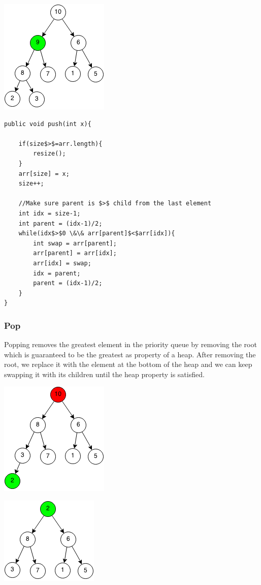 \documentclass[11pt,oneside]{book}
\makeatletter
\def\maxwidth#1{\ifdim\Gin@nat@width>#1 #1\else\Gin@nat@width\fi}
\makeatother
\begin{document}
\includegraphics[width=\maxwidth{\textwidth}]{maxheappush3.png}

\begin{lstlisting}
public void push(int x){
        
    if(size$>$=arr.length){
        resize();
    }
    arr[size] = x;
    size++;
    
    //Make sure parent is $>$ child from the last element
    int idx = size-1;
    int parent = (idx-1)/2;
    while(idx$>$0 \&\& arr[parent]$<$arr[idx]){
        int swap = arr[parent];
        arr[parent] = arr[idx];
        arr[idx] = swap;
        idx = parent;
        parent = (idx-1)/2;
    }
}
\end{lstlisting}

\subsubsection{Pop}

Popping removes the greatest element in the priority queue by removing the root which is guaranteed to be the greatest as property of a heap. After removing the root, we replace it with the element at the bottom of the heap and we can keep swapping it with its children until the heap property is satisfied.

\includegraphics[width=\maxwidth{\textwidth}]{maxheappop.png}

\includegraphics[width=\maxwidth{\textwidth}]{maxheappop1.png}
\end{document}
